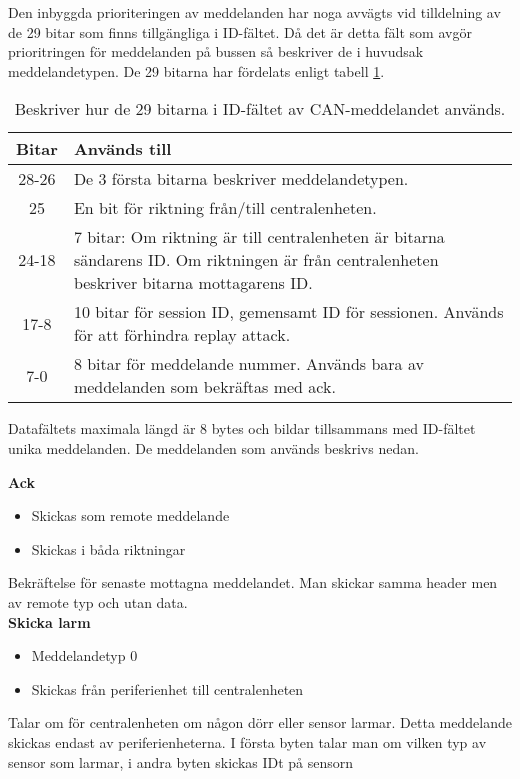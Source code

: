 Den inbyggda prioriteringen av meddelanden har noga avvägts vid tilldelning av de 29 bitar som finns tillgängliga i ID-fältet.
Då det är detta fält som avgör prioritringen för meddelanden på bussen så beskriver de i huvudsak meddelandetypen.
De 29 bitarna har fördelats enligt tabell \ref{tab:idbitar}.

\begin{table}[H]
	\centering
	\begin{tabular}{|c|p{}|}
		\hline
		Bitar 	& Används till \\ \hline \hline
		28-26		& De 3 första bitarna beskriver meddelandetypen. \\ \hline
		25		& En bit för riktning från/till centralenheten. \\ \hline
		24-18	& 7 bitar:
		Om riktning är till centralenheten är bitarna sändarens ID.
		Om riktningen är från centralenheten beskriver bitarna mottagarens ID. \\ \hline
		17-8 & 10 bitar för session ID, gemensamt ID för sessionen. Används för att förhindra replay attack. \\ \hline
		7-0 & 8 bitar för meddelande nummer. Används bara av meddelanden som bekräftas med ack. \\ \hline

	\end{tabular}
	\caption{Beskriver hur de 29 bitarna i ID-fältet av CAN-meddelandet används.}
	\label{tab:idbitar}
\end{table}


Datafältets maximala längd är 8 bytes och bildar tillsammans med ID-fältet unika meddelanden. De meddelanden som används beskrivs nedan.



\textbf{Ack}
\begin{itemize}
    \item Skickas som remote meddelande
    \item Skickas i båda riktningar
\end{itemize}
Bekräftelse för senaste mottagna meddelandet. Man skickar samma header men av remote typ och utan data. \\


\textbf{Skicka larm}
\begin{itemize}
    \item Meddelandetyp 0
    \item Skickas från periferienhet till centralenheten
\end{itemize}
Talar om för centralenheten om någon dörr eller sensor larmar. Detta meddelande skickas endast av periferienheterna. I första byten talar man om vilken typ av sensor som larmar, i andra byten skickas IDt på sensorn\\


